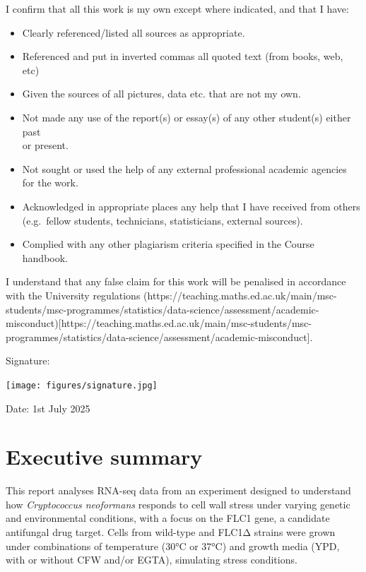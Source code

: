 \documentclass[
  a4paper,
]{scrreprt}
\providecommand{\tightlist}{%
  \setlength{\itemsep}{0pt}\setlength{\parskip}{0pt}}\usepackage{longtable,booktabs,array}
\begin{document}
I confirm that all this work is my own except where indicated, and that
I have:

\begin{itemize}
\tightlist
\item
  Clearly referenced/listed all sources as appropriate.\\
\item
  Referenced and put in inverted commas all quoted text (from books,
  web, etc)\\
\item
  Given the sources of all pictures, data etc. that are not my own.\\
\item
  Not made any use of the report(s) or essay(s) of any other student(s)
  either past\\
  or present.
\item
  Not sought or used the help of any external professional academic
  agencies for the work.
\item
  Acknowledged in appropriate places any help that I have received from
  others (e.g.~fellow students, technicians, statisticians, external
  sources).
\item
  Complied with any other plagiarism criteria specified in the Course
  handbook.
\end{itemize}

I understand that any false claim for this work will be penalised in
accordance with the University regulations
(https://teaching.maths.ed.ac.uk/main/msc-students/msc-programmes/statistics/data-science/assessment/academic-misconduct){[}https://teaching.maths.ed.ac.uk/main/msc-students/msc-programmes/statistics/data-science/assessment/academic-misconduct{]}.

Signature:

\texttt{[image: figures/signature.jpg]}

Date: 1st July 2025


\chapter*{Executive summary}\label{executive-summary}


This report analyses RNA-seq data from an experiment designed to
understand how \emph{Cryptococcus neoformans} responds to cell wall
stress under varying genetic and environmental conditions, with a focus
on the FLC1 gene, a candidate antifungal drug target. Cells from
wild-type and FLC1Δ strains were grown under combinations of temperature
(30°C or 37°C) and growth media (YPD, with or without CFW and/or EGTA),
simulating stress conditions.
\end{document}
